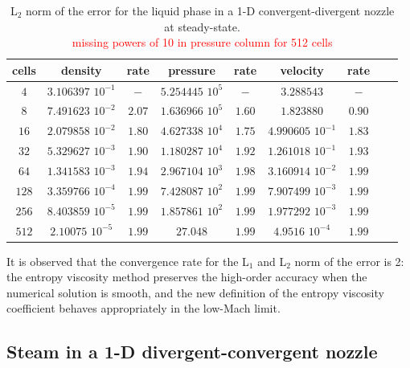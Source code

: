 \documentclass[preprint,10pt]{elsarticle}
\newcommand{\tcr}[1]{\textcolor{red}{#1}}
\begin{document}
%
\begin{table}[H]
\begin{center}
 \caption{\label{tbl:l2_norm_liq} L$_2$ norm of the error for the liquid phase in a 1-D convergent-divergent nozzle at steady-state.\\ \tcr{missing powers of 10 in pressure column for 512 cells} }
 \begin{tabular}{|c|c|c|c|c|c|c|c|c|}
 \hline
cells & density              & rate   & pressure            & rate   & velocity             & rate   \\ \hline
$4$   & $3.106397$ $10^{-1}$ & $-$    & $5.254445$ $10^{5}$ & $-$    & $3.288543$           & $-$    \\ \hline
$8$   & $7.491623$ $10^{-2}$ & $2.07$ & $1.636966$ $10^{5}$ & $1.60$ & $1.823880$           & $0.90$ \\ \hline
$16$  & $2.079858$ $10^{-2}$ & $1.80$ & $4.627338$ $10^{4}$ & $1.75$ & $4.990605$ $10^{-1}$ & $1.83$ \\ \hline
$32$  & $5.329627$ $10^{-3}$ & $1.90$ & $1.180287$ $10^{4}$ & $1.92$ & $1.261018$ $10^{-1}$ & $1.93$ \\ \hline
$64$  & $1.341583$ $10^{-3}$ & $1.94$ & $2.967104$ $10^{3}$ & $1.98$ & $3.160914$ $10^{-2}$ & $1.99$ \\ \hline
$128$ & $3.359766$ $10^{-4}$ & $1.99$ & $7.428087$ $10^{2}$ & $1.99$ & $7.907499$ $10^{-3}$ & $1.99$ \\ \hline
$256$ & $8.403859$ $10^{-5}$ & $1.99$ & $1.857861$ $10^{2}$ & $1.99$ & $1.977292$ $10^{-3}$ & $1.99$ \\ \hline
$512$ & $2.10075$ $10^{-5}$  & $1.99$ & $27.048$            & $1.99$ & $4.9516$ $10^{-4}$   & $1.99$ \\ \hline
\end{tabular}
\end{center}
\end{table}
It is observed that the convergence rate for the L$_1$ and L$_2$ norm of the error is 2: the entropy viscosity method preserves the high-order accuracy when the numerical solution is smooth, and the new definition of the entropy viscosity coefficient behaves appropriately in the low-Mach limit.

\subsection{Steam in a 1-D divergent-convergent nozzle} \label{sec:steam_nozzle}
\end{document}

